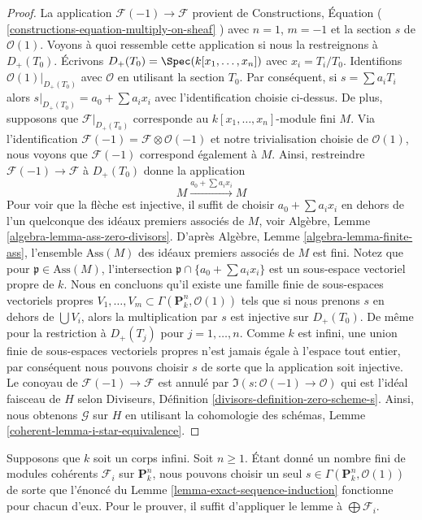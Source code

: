\begin{proof}
La application $\mathcal{F}(-1) \to \mathcal{F}$ provient
de Constructions, Équation (
\ref{constructions-equation-multiply-on-sheaf} ) avec $n =
1$, $m = -1$ et la section $s$ de $\mathcal{O}(1)$. Voyons à
quoi ressemble cette application si nous la restreignons à
$D_{+}(T_0)$. Écrivons $D_{+}(T_0) = \Spec(k[x_1, \ldots,
x_n])$ avec $x_i = T_i/T_0$. Identifions
$\mathcal{O}(1)|_{D_{+}(T_0)}$ avec $\mathcal{O}$ en utilisant la
section $T_0$. Par conséquent, si $s = \sum a_iT_i$ alors
$s|_{D_{+}(T_0)} = a_0 + \sum a_ix_i$ avec l'identification
choisie ci-dessus. De plus, supposons que
$\mathcal{F}|_{D_{+}(T_0)}$ corresponde au $k[x_1, \ldots, x_n]$-module
fini $M$. Via l'identification $\mathcal{F}(-1) = \mathcal{F} \otimes
\mathcal{O}(-1)$ et notre trivialisation choisie de $\mathcal{O}(1)$,
nous voyons que $\mathcal{F}(-1)$ correspond également à $M$. Ainsi,
restreindre $\mathcal{F}(-1) \to \mathcal{F}$ à $D_{+}(T_0)$ donne la application
$$
M \xrightarrow{a_0 + \sum a_ix_i} M
$$
Pour voir que la flèche est injective, il suffit de choisir $a_0
+ \sum a_ix_i$ en dehors de l'un quelconque des idéaux premiers
associés de $M$, voir Algèbre, Lemme
\ref{algebra-lemma-ass-zero-divisors}. D'après Algèbre, Lemme
\ref{algebra-lemma-finite-ass}, l'ensemble $\text{Ass}(M)$ des
idéaux premiers associés de $M$ est fini. Notez que pour
$\mathfrak p \in \text{Ass}(M)$, l'intersection $\mathfrak p \cap
\{a_0 + \sum a_i x_i\}$ est un sous-espace vectoriel propre de $k$.
Nous en concluons qu'il existe une famille finie de sous-espaces
vectoriels propres $V_1, \ldots, V_m \subset \Gamma(\mathbf{P}^n_k,
\mathcal{O}(1))$ tels que si nous prenons $s$ en dehors de $\bigcup
V_i$, alors la multiplication par $s$ est injective sur
$D_{+}(T_0)$. De même pour la restriction à $D_{+}(T_j)$ pour $j =
1, \ldots, n$. Comme $k$ est infini, une union finie de sous-espaces
vectoriels propres n'est jamais égale à l'espace tout entier, par
conséquent nous pouvons choisir $s$ de sorte que la application soit
injective. Le conoyau de $\mathcal{F}(-1) \to \mathcal{F}$ est annulé
par $\Im(s : \mathcal{O}(-1) \to \mathcal{O})$ qui est l'idéal
faisceau de $H$ selon Diviseurs, Définition
\ref{divisors-definition-zero-scheme-s}. Ainsi, nous obtenons $\mathcal{G}$ sur $H$ en
utilisant la cohomologie des schémas, Lemme \ref{coherent-lemma-i-star-equivalence}.
\end{proof}

\begin{remark}
\label{remark-exact-sequence-induction}
Supposons que $k$ soit un corps infini. Soit $n \geq 1$. Étant
donné un nombre fini de modules cohérents $\mathcal{F}_i$ sur
$\mathbf{P}^n_k$, nous pouvons choisir un seul $s \in
\Gamma(\mathbf{P}^n_k, \mathcal{O}(1))$ de sorte que l'énoncé du Lemme
\ref{lemma-exact-sequence-induction} fonctionne pour chacun d'eux. Pour
le prouver, il suffit d'appliquer le lemme à $\bigoplus \mathcal{F}_i$.
\end{remark}


